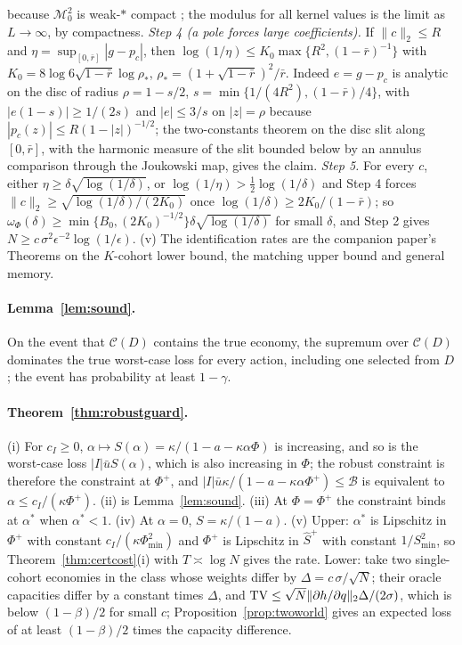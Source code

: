 because $\mathcal M_0^2$ is weak-$*$ compact \citep{donoho1994}; the modulus for all kernel values is the limit as $L\to\infty$, by compactness. \emph{Step 4 (a pole forces large coefficients).} If $\|c\|_2\le R$ and $\eta=\sup_{[0,\bar r]}|g-p_c|$, then $\log(1/\eta)\le K_0\max\{R^2,(1-\bar r)^{-1}\}$ with $K_0=8\log6\sqrt{1-\bar r}\log\rho_*$, $\rho_*=(1+\sqrt{1-\bar r})^2/\bar r$. Indeed $e=g-p_c$ is analytic on the disc of radius $\rho=1-s/2$, $s=\min\{1/(4R^2),(1-\bar r)/4\}$, with $|e(1-s)|\ge1/(2s)$ and $|e|\le3/s$ on $|z|=\rho$ because $|p_c(z)|\le R(1-|z|)^{-1/2}$; the two-constants theorem on the disc slit along $[0,\bar r]$, with the harmonic measure of the slit bounded below by an annulus comparison through the Joukowski map, gives the claim. \emph{Step 5.} For every $c$, either $\eta\ge\delta\sqrt{\log(1/\delta)}$, or $\log(1/\eta)>\tfrac12\log(1/\delta)$ and Step 4 forces $\|c\|_2\ge\sqrt{\log(1/\delta)/(2K_0)}$ once $\log(1/\delta)\ge2K_0/(1-\bar r)$; so $\omega_\Phi(\delta)\ge\min\{B_0,(2K_0)^{-1/2}\}\delta\sqrt{\log(1/\delta)}$ for small $\delta$, and Step 2 gives $N\ge c\,\sigma^2\epsilon^{-2}\log(1/\epsilon)$. (v) The identification rates are the companion paper's Theorems on the $K$-cohort lower bound, the matching upper bound and general memory.

\paragraph{Lemma~\ref{lem:sound}.} On the event that $\mathcal C(D)$ contains the true economy, the supremum over $\mathcal C(D)$ dominates the true worst-case loss for every action, including one selected from $D$; the event has probability at least $1-\gamma$.

\paragraph{Theorem~\ref{thm:robustguard}.} (i) For $c_I\ge0$, $\alpha\mapsto S(\alpha)=\kappa/(1-a-\kappa\alpha\Phi)$ is increasing, and so is the worst-case loss $|I|\bar uS(\alpha)$, which is also increasing in $\Phi$; the robust constraint is therefore the constraint at $\Phi^+$, and $|I|\bar u\kappa/(1-a-\kappa\alpha\Phi^+)\le\mathcal B$ is equivalent to $\alpha\le c_I/(\kappa\Phi^+)$. (ii) is Lemma~\ref{lem:sound}. (iii) At $\Phi=\Phi^+$ the constraint binds at $\alpha^*$ when $\alpha^*<1$. (iv) At $\alpha=0$, $S=\kappa/(1-a)$. (v) Upper: $\alpha^*$ is Lipschitz in $\Phi^+$ with constant $c_I/(\kappa\Phi_{\min}^2)$ and $\Phi^+$ is Lipschitz in $\hat S^+$ with constant $1/S_{\min}^2$, so Theorem~\ref{thm:certcost}(i) with $T\asymp\log N$ gives the rate. Lower: take two single-cohort economies in the class whose weights differ by $\Delta=c\,\sigma/\sqrt N$; their oracle capacities differ by a constant times $\Delta$, and ${\rm TV}\le\sqrt N\|\partial h/\partial q\|_2\Delta/(2\sigma)$, which is below $(1-\beta)/2$ for small $c$; Proposition~\ref{prop:twoworld} gives an expected loss of at least $(1-\beta)/2$ times the capacity difference.

